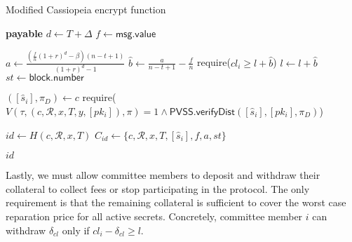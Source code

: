 \begin{algorithm}[h]
\caption{Modified Cassiopeia \textsf{encrypt} function}
\label{alg:encrypt_incentives}
    \begin{algorithmic}[1]
             \textbf{payable}
                \State $d \gets T + \Delta$
                \State $f \gets \textsf{msg.value}$

                \State $a \gets \frac{(\frac{f}{n}(1 + r)^d - \beta)(n - t + 1)}{(1 + r)^d - 1}$ 
                \State $\hat{b} \gets \frac{a}{n - t + 1} - \frac{f}{n}$ 
                    \State require($cl_i \geq l + \hat{b}$)
                \EndFor
                \State $l \gets l + \hat{b}$
                \State $st \gets \textsf{block.number}$

                \State $([\hat{s}_i], \pi_D) \gets c$
                \State require($V(\tau, (c, \mathcal{R}, x, T, y, [pk_i]), \pi) = 1 \land \textsf{PVSS.verifyDist}([\hat{s}_i], [pk_i], \pi_D)$)

                \State $id \gets H(c, \mathcal{R}, x, T)$
                \State $C_{id} \gets \{c, \mathcal{R}, x, T, [\hat{s}_i], f, a, st\}$

                \State \Return $id$
            \EndFunction
    \end{algorithmic}
\end{algorithm}

Lastly, we must allow committee members to deposit and withdraw their collateral to collect fees or stop participating in the protocol.
The only requirement is that the remaining collateral is sufficient to cover the worst case reparation price for all active secrets.
Concretely, committee member $i$ can withdraw $\delta_{cl}$ only if $cl_i - \delta_{cl} \geq l$.